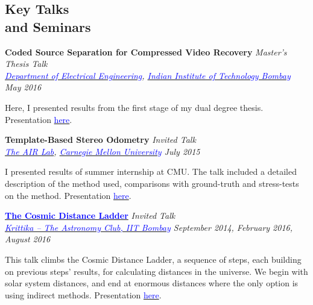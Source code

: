 \documentclass[margin,line]{res}
\newenvironment{list1}{
  \begin{list}{\ding{113}}{%
      \setlength{\itemsep}{0in}
      \setlength{\parsep}{0in} \setlength{\parskip}{0in}
      \setlength{\topsep}{0in} \setlength{\partopsep}{0in} 
      \setlength{\leftmargin}{0.17in}}}{\end{list}}
\begin{document}
\begin{resume}
\section{\sc Key Talks \\ and Seminars}
{\bf Coded Source Separation for Compressed Video Recovery} \hfill {\em Master's Thesis Talk} \\
{\em \href{http://www.ee.iitb.ac.in/}{\textcolor{blue}{Department of Electrical Engineering}}, \href{http://www.iitb.ac.in/}{\textcolor{blue}{Indian Institute of Technology Bombay}} \hfill May 2016} \\
\vspace*{-.15in}
\begin{list1}
\item[] Here, I presented results from the first stage of my dual degree thesis. Presentation \href{http://alankarkotwal.github.io/sre.pptx}{\textcolor{blue} {here}}.
\end{list1}

\vspace*{-0.1in}

{\bf Template-Based Stereo Odometry} \hfill {\em Invited Talk} \\
{\em \href{http://theairlab.org/}{\textcolor{blue}{The AIR Lab}}, \href{http://www.cmu.edu/}{\textcolor{blue}{Carnegie Mellon University}} \hfill July 2015} \\
\vspace*{-.15in}
\begin{list1}
\item[] I presented results of summer internship at CMU. The talk included a detailed description of the method used, comparisons with ground-truth and stress-tests on the method. Presentation \href{http://alankarkotwal.github.io/intern_presentation.pptx}{\textcolor{blue} {here}}.
\end{list1}

\vspace*{-0.1in}

{\bf \href{http://www.stab-iitb.org/krittika/the-cosmic-ladder-distance}{\textcolor{blue} {The Cosmic Distance Ladder}}} \hfill {\em Invited Talk} \\
{\em \href{http://www.stab-iitb.org/krittika/}{\textcolor{blue} {Krittika -- The Astronomy Club, IIT Bombay}} \hfill September 2014, February 2016, August 2016} \\
\vspace*{-.15in}
\begin{list1}
\item[] This talk climbs the Cosmic Distance Ladder, a sequence of steps, each building on previous steps' results, for calculating distances in the universe. We begin with solar system distances, and end at enormous distances where the only option is using indirect methods. Presentation \href{http://alankarkotwal.github.io/CosmicDistanceLadder.pptx}{\textcolor{blue} {here}}.
\end{list1}


\end{resume}
\end{document}

